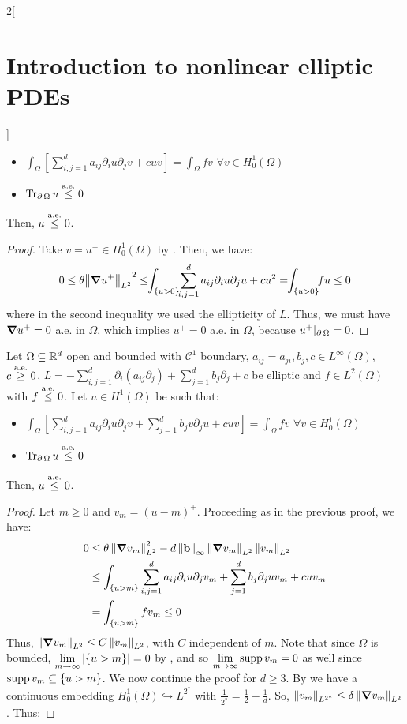 \documentclass[../../../main_math.tex]{subfiles}
\begin{document}
\begin{multicols}{2}[\section{Introduction to nonlinear elliptic PDEs}]
\begin{theorem}
    \begin{itemize}
      \item $\displaystyle \int_\Omega\left[\sum_{i,j=1}^da_{ij}\partial_iu\partial_jv+cuv\right]=\int_\Omega fv$ $\forall v\in H^1_0(\Omega)$
      \item $\Tr_{\operatorname{\partial}{\Omega}}u\overset{\text{a.e.}}{\leq}0$
    \end{itemize}
    Then, $u\overset{\text{a.e.}}{\leq}0$.
  \end{theorem}
  \begin{proof}
    Take $v=u^+\in H^1_0(\Omega)$ by . Then, we have:
    $$
      0\leq \theta {\norm{\grad u^+}_{L^2}}^2\leq\!\! \int_{\{u>0\}}\!\!\sum_{i,j=1}^d a_{ij}\partial_iu\partial_ju+cu^2=\!\!\int_{\{u>0\}} \!\!fu\leq 0
    $$
    where in the second inequality we used the ellipticity of $L$. Thus, we must have $\grad u^+=0$ a.e. in $\Omega$, which implies $u^+=0$ a.e. in $\Omega$, because $u^+|_{\operatorname{\partial}{\Omega}}=0$.
  \end{proof}
  \begin{theorem}\label{INEPDE:weak_max_principle}
    Let $\Omega\subseteq\mathbb{R}^d$ open and bounded with $\mathcal{C}^1$ boundary, $a_{ij}=a_{ji},b_j,c\in L^\infty(\Omega)$, $c \overset{\text{a.e.}}{\geq}0$, $L=-\sum_{i,j=1}^d\partial_i(a_{ij}\partial_j)+\sum_{j=1}^db_j\partial_j+c$ be elliptic and $f\in L^2(\Omega)$ with $f\overset{\text{a.e.}}{\leq} 0$. Let $u\in H^1(\Omega)$ be such that:
    \begin{itemize}
      \item $\displaystyle \int_\Omega\left[\sum_{i,j=1}^da_{ij}\partial_iu\partial_jv+ \sum_{j=1}^db_jv\partial_ju+cuv\right]=\int_\Omega fv$ $\forall v\in H^1_0(\Omega)$
      \item $\Tr_{\operatorname{\partial}{\Omega}}u\overset{\text{a.e.}}{\leq}0$
    \end{itemize}
    Then, $u\overset{\text{a.e.}}{\leq}0$.
  \end{theorem}
  \begin{proof}
    Let $m\geq 0$ and $v_m={(u-m)}^+$. Proceeding as in the previous proof, we have:
    \begin{align*}
      0 & \leq \theta \left\|\grad v_m\right\|_{L^2}^2-d\left\|\boldsymbol{\mathrm{b}}\right\|_\infty\left\|\grad v_m\right\|_{L^2}\left\|v_m\right\|_{L^2}       \\
        & \leq \int_{\{u>m\}}\sum_{i,j=1}^d a_{ij}\partial_iu\partial_jv_m+\sum_{j=1}^db_j\partial_ju v_m+cu v_m \\
        & =\int_{\{u>m\}}fv_m\leq 0
    \end{align*}
    Thus, $\left\|\grad v_m\right\|_{L^2}\leq C \left\|v_m\right\|_{L^2}$, with $C$ independent of $m$. Note that since $\Omega$ is bounded, $\displaystyle\lim_{m\to\infty}\abs{\{u>m\}}=0$ by , and so $\displaystyle\lim_{m\to\infty}\operatorname{supp} v_m=0$ as well since $\operatorname{supp} v_m\subseteq \{u>m\}$. We now continue the proof for $d\geq 3$. By  we have a continuous embedding $H_0^1(\Omega)\hookrightarrow L^{2^*}$ with $\frac{1}{2^*}=\frac{1}{2}-\frac{1}{d}$. So, $\left\|v_m\right\|_{L^{2^*}}\leq \delta \left\|\grad v_m\right\|_{L^2}$. Thus:

\end{proof}
\end{multicols}
\end{document}
